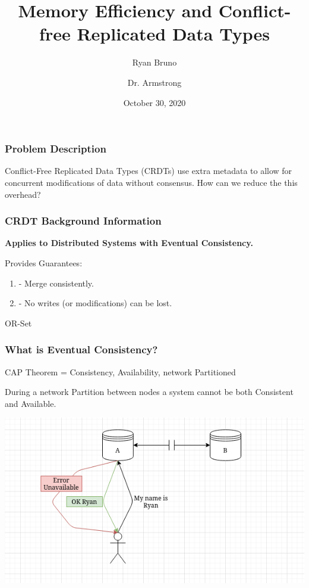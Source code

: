 \documentclass{beamer}
\title{Memory Efficiency and Conflict-free Replicated Data Types}
\author{Ryan Bruno \and Dr. Armstrong}
\date{October 30, 2020}
\begin{document}
    \begin{frame}
        \titlepage
    \end{frame}
    \begin{frame}[shrink]
        \frametitle{Problem Description}
        \begin{center}
        \begin{minipage}{4in}
          Conflict-Free Replicated Data Types (CRDTs) use extra metadata
          to allow for concurrent modifications of data without
          consensus. How can we reduce the this overhead?
        \end{minipage}
        \end{center}
    \end{frame}
    \begin{frame}[shrink]
        \frametitle{CRDT Background Information}

        \textbf{Applies to Distributed Systems with Eventual Consistency.}

        Provides Guarantees:

        \begin{enumerate}
        \item - Merge consistently.
        \item - No writes (or modifications) can be lost.
        \end{enumerate}

        OR-Set

    \end{frame}
    \begin{frame}
        \frametitle{What is Eventual Consistency?}

        CAP Theorem = Consistency, Availability, network Partitioned

        \begin{center}
        \begin{minipage}{4in}
         During a network Partition between nodes a system cannot be
         both {\color{red}Consistent} and {\color{green}Available}.
        \end{minipage}
        \end{center}
        \begin{center}
        \includegraphics[width=.75\textwidth]{CapDiagram}
        \end{center}
    \end{frame}
\end{document}
